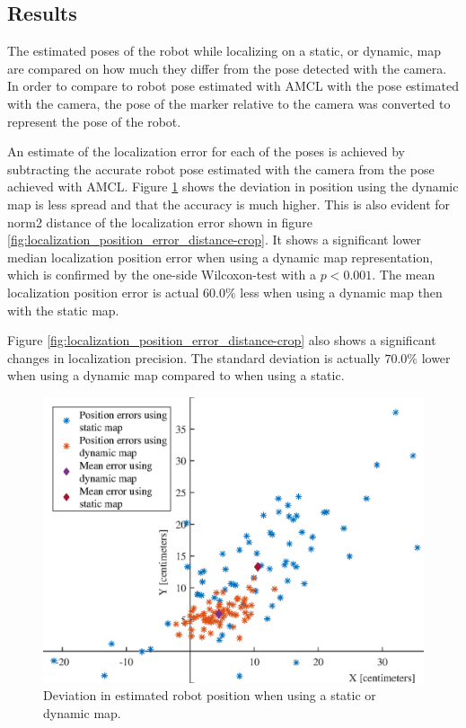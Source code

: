 \subsection{Results}
The estimated poses of the robot while localizing on a static, or dynamic, map are compared on how much they differ from the pose detected with the camera.
In order to compare to robot pose estimated with AMCL with the pose estimated with the camera, the pose of the marker relative to the camera was converted to represent the pose of the robot.

An estimate of the localization error for each of the poses is achieved by subtracting the accurate robot pose estimated with the camera from the pose achieved with AMCL.
Figure \ref{fig:precision_test_positions} shows the deviation in position using the dynamic map is less spread and that the accuracy is much higher.
This is also evident for norm2 distance of the localization error shown in figure \ref{fig:localization_position_error_distance-crop}. 
It shows a significant lower median localization position error when using a dynamic map representation, which is confirmed by the one-side Wilcoxon-test with a $p<0.001$.
The mean localization position error is actual $60.0\%$ less when using a dynamic map then with the static map.

Figure \ref{fig:localization_position_error_distance-crop} also shows a significant changes in localization precision. 
The standard deviation is actually $70.0\%$ lower when using a dynamic map compared to when using a static.

\begin{figure}
    \centering
    \includegraphics[scale=1]{chapters/evaluation/figures/Localization_position_errors}
    \caption{Deviation in estimated robot position when using a static or dynamic map.}
    \label{fig:precision_test_positions}
\end{figure}

